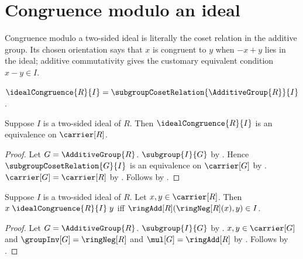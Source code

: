 


\section{Congruence modulo an ideal}

Congruence modulo a two-sided ideal is literally the coset relation in the
additive group.  Its chosen orientation says that $x$ is congruent to $y$
when $-x+y$ lies in the ideal; additive commutativity gives the customary
equivalent condition $x-y\in I$.

\begin{definition}\label{ideal_congruence}
    $\idealCongruence{R}{I}=
        \subgroupCosetRelation{\AdditiveGroup{R}}{I}$.
\end{definition}

\begin{theorem}\label{ideal_congruence_equivalence}
    Suppose $I$ is a two-sided ideal of $R$.
    Then $\idealCongruence{R}{I}$ is an equivalence on $\carrier[R]$.
\end{theorem}
\begin{proof}
    Let $G=\AdditiveGroup{R}$.
    $\subgroup{I}{G}$ by
        .
    Hence $\subgroupCosetRelation{G}{I}$ is an equivalence on
        $\carrier[G]$ by .
    $\carrier[G]=\carrier[R]$ by .
    Follows by .
\end{proof}

\begin{proposition}\label{ideal_congruence_iff_neg_add}
    Suppose $I$ is a two-sided ideal of $R$.
    Let $x,y\in\carrier[R]$.
    Then $x\mathrel{\idealCongruence{R}{I}}y$ iff
        $\ringAdd[R](\ringNeg[R](x),y)\in I$.
\end{proposition}
\begin{proof}
    Let $G=\AdditiveGroup{R}$.
    $\subgroup{I}{G}$ by
        .
    $x,y\in\carrier[G]$ and
        $\groupInv[G]=\ringNeg[R]$ and
        $\mul[G]=\ringAdd[R]$ by
        .
    Follows by
        .
\end{proof}

